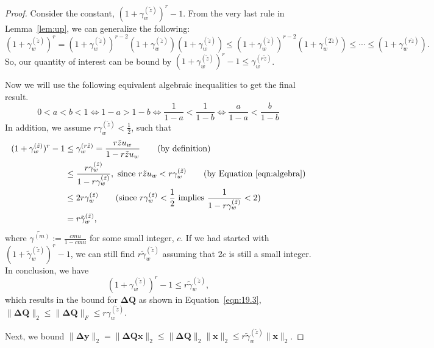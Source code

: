 \documentclass[review,onefignum,onetabnum]{siamart190516}
\newcommand{\bb}[1]{\mathbf{#1}}
\begin{document}
\begin{proof}
	Consider the constant, $(1+\gamma_w^{(\tilde{z})})^r-1$.
	From the very last rule in Lemma~\ref{lem:up}, we can generalize the following:
	\begin{equation*}
	(1+\gamma_w^{(\tilde{z})})^r = (1+\gamma_w^{(\tilde{z})})^{r-2}(1+\gamma_w^{(\tilde{z})})(1+\gamma_w^{(\tilde{z})}) \leq  (1+\gamma_w^{(\tilde{z})})^{r-2}(1+\gamma_w^{(2\tilde{z})}) \leq \cdots \leq (1+\gamma_w^{(r\tilde{z})}).
	\end{equation*}
	So, our quantity of interest can be bound by $(1+\gamma_w^{(\tilde{z})})^r-1 \leq \gamma_w^{(r\tilde{z})}$.
	
	Now we will use the following equivalent algebraic inequalities to get the final result.
	\begin{equation}
	0<a<b<1 \Leftrightarrow 1-a > 1-b \Leftrightarrow \frac{1}{1-a} <\frac{1}{1-b} \Leftrightarrow \frac{a}{1-a} < \frac{b}{1-b}
	\label{eqn:algebra}
	\end{equation}
	In addition, we assume $r\gamma_w^{(\tilde{z})}< \frac{1}{2}$, such that 
	\begin{align*}
	(1+\gamma_w^{(\tilde{z})})^r-1 &\leq \gamma_w^{(r\tilde{z})} = \frac{r\tilde{z}u_w}{1-r\tilde{z}u_w}\qquad\text{(by definition)}\\
	&\leq \frac{r\gamma_w^{(\tilde{z})}}{1-r\gamma_w^{(\tilde{z})}},\text{ since } r\tilde{z}u_w < r\gamma_w^{(\tilde{z})}\qquad\text{(by Equation \ref{eqn:algebra})}\\
	&\leq 2 r \gamma_w^{(\tilde{z})}\qquad\text{(since $r\gamma_w^{(\tilde{z})}< \frac{1}{2}$ implies  $\frac{1}{1-r\gamma_w^{(\tilde{z})}} < 2$)}\\
	&= r\tilde{\gamma}_w^{(\tilde{z})},
	\end{align*}
	where $\tilde{\gamma^{(m)}}:= \frac{cmu}{1-cmu}$ for some small integer, $c$.
	If we had started with $(1+\tilde{\gamma}_w^{(\tilde{z})})^r-1$, we can still find $r\tilde{\gamma}_w^{(\tilde{z})}$ assuming that $2c$ is still a small integer. 
	In conclusion, we have 
	$$
	(1+\gamma_w^{(\tilde{z})})^r-1 \leq r\tilde{\gamma}_w^{(\tilde{z})},
	$$
	which results in the bound for $\bb{\Delta Q}$ as shown in Equation~\ref{eqn:19.3}, $\|\bb{\Delta Q}\|_2 \leq \|\bb{\Delta Q}\|_F \leq r\gamma_w^{(\tilde{z})}$.
	
	Next, we bound $\|\bb{\Delta y}\|_2 = \|\bb{\Delta Q x}\|_2 \leq \|\bb{\Delta Q}\|_2 \|\bb{x}\|_2 \leq  r\tilde{\gamma}_w^{(\tilde{z})}\|\bb{x}\|_2$.
	

\end{proof}
\end{document}
